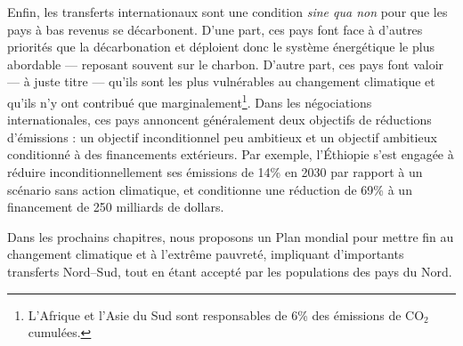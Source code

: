 \documentclass[a5paper,french]{memoir}
\begin{document}

Enfin, les transferts internationaux sont une condition \textit{sine qua non} pour que les pays à bas revenus se décarbonent. D'une part, ces pays font face à d'autres priorités que la décarbonation et déploient donc le système énergétique le plus abordable --- reposant souvent sur le charbon. D'autre part, ces pays font valoir --- à juste titre --- qu'ils sont les plus vulnérables au changement climatique et qu'ils n'y ont contribué que marginalement\footnote{L'Afrique et l'Asie du Sud sont responsables de 6\% des émissions de CO$_\text{2}$ cumulées. %
}. Dans les négociations internationales, ces pays annoncent généralement deux objectifs de réductions d'émissions : un objectif inconditionnel peu ambitieux et un objectif ambitieux conditionné à des financements extérieurs. Par exemple, l'Éthiopie s'est engagée à réduire inconditionnellement ses émissions de 14\% en 2030 par rapport à un scénario sans action climatique, et conditionne une réduction de 69\% à un financement de 250 milliards de dollars.%

Dans les prochains chapitres, nous proposons un Plan mondial pour mettre fin au changement climatique et à l'extrême pauvreté, impliquant d'importants transferts Nord--Sud, tout en étant accepté par %
les populations des pays du Nord.
\end{document}

